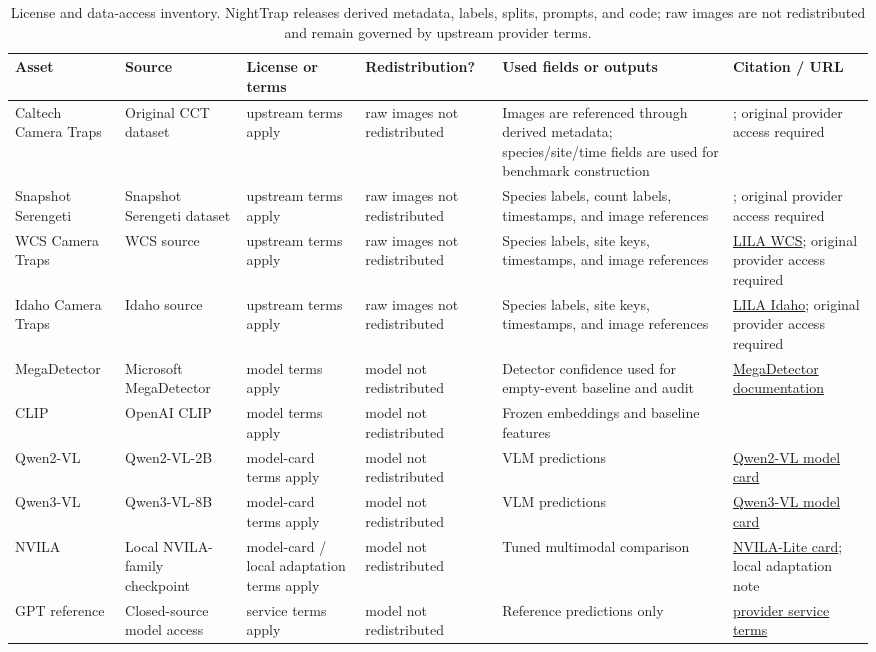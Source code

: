 \documentclass{article}
\begin{document}
\begin{table}[h]
\centering
\caption{License and data-access inventory. NightTrap releases derived metadata, labels, splits, prompts, and code; raw images are not redistributed and remain governed by upstream provider terms.}
\label{tab:license_data_access}
\scriptsize
\setlength{\tabcolsep}{2.5pt}
\begin{tabularx}{\textwidth}{p{2.25cm}p{2.4cm}p{2.45cm}p{2.0cm}X p{2.45cm}}
\toprule
Asset & Source & License or terms & Redistribution? & Used fields or outputs & Citation / URL \\
\midrule
Caltech Camera Traps & Original CCT dataset & upstream terms apply & raw images not redistributed & Images are referenced through derived metadata; species/site/time fields are used for benchmark construction & \citep{beery2019iwildcam}; original provider access required \\
Snapshot Serengeti & Snapshot Serengeti dataset & upstream terms apply & raw images not redistributed & Species labels, count labels, timestamps, and image references & \citep{norouzzadeh2017snapshot}; original provider access required \\
WCS Camera Traps & WCS source & upstream terms apply & raw images not redistributed & Species labels, site keys, timestamps, and image references & \href{https://lila.science/datasets/wcscameratraps}{LILA WCS}; original provider access required \\
Idaho Camera Traps & Idaho source & upstream terms apply & raw images not redistributed & Species labels, site keys, timestamps, and image references & \href{https://lila.science/datasets/idaho-camera-traps}{LILA Idaho}; original provider access required \\
MegaDetector & Microsoft MegaDetector & model terms apply & model not redistributed & Detector confidence used for empty-event baseline and audit & \href{https://github.com/agentmorris/MegaDetector}{MegaDetector documentation} \\
CLIP & OpenAI CLIP & model terms apply & model not redistributed & Frozen embeddings and baseline features & \citep{radford2021clip} \\
Qwen2-VL & Qwen2-VL-2B & model-card terms apply & model not redistributed & VLM predictions & \href{https://huggingface.co/Qwen/Qwen2-VL-2B-Instruct}{Qwen2-VL model card} \\
Qwen3-VL & Qwen3-VL-8B & model-card terms apply & model not redistributed & VLM predictions & \href{https://huggingface.co/Qwen/Qwen3-VL-8B-Instruct}{Qwen3-VL model card} \\
NVILA & Local NVILA-family checkpoint & model-card / local adaptation terms apply & model not redistributed & Tuned multimodal comparison & \href{https://huggingface.co/Efficient-Large-Model/NVILA-Lite-8B-hf-preview}{NVILA-Lite card}; local adaptation note \\
GPT reference & Closed-source model access & service terms apply & model not redistributed & Reference predictions only & \href{https://openai.com/policies/service-terms/}{provider service terms} \\
\bottomrule
\end{tabularx}
\end{table}
\end{document}
